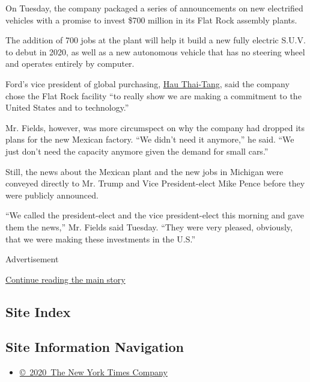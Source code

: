 On Tuesday, the company packaged a series of announcements on new
electrified vehicles with a promise to invest \$700 million in its Flat
Rock assembly plants.

The addition of 700 jobs at the plant will help it build a new fully
electric S.U.V. to debut in 2020, as well as a new autonomous vehicle
that has no steering wheel and operates entirely by computer.

Ford's vice president of global purchasing,
\href{https://media.ford.com/content/fordmedia/fna/us/en/people/hau-thai-tang.html}{Hau
Thai-Tang}, said the company chose the Flat Rock facility ``to really
show we are making a commitment to the United States and to
technology.''

Mr. Fields, however, was more circumspect on why the company had dropped
its plans for the new Mexican factory. ``We didn't need it anymore,'' he
said. ``We just don't need the capacity anymore given the demand for
small cars.''

Still, the news about the Mexican plant and the new jobs in Michigan
were conveyed directly to Mr. Trump and Vice President-elect Mike Pence
before they were publicly announced.

``We called the president-elect and the vice president-elect this
morning and gave them the news,'' Mr. Fields said Tuesday. ``They were
very pleased, obviously, that we were making these investments in the
U.S.''

Advertisement

\protect\hyperlink{after-bottom}{Continue reading the main story}

\hypertarget{site-index}{%
\subsection{Site Index}\label{site-index}}

\hypertarget{site-information-navigation}{%
\subsection{Site Information
Navigation}\label{site-information-navigation}}

\begin{itemize}
\tightlist
\item
  \href{https://help.nytimes.com/hc/en-us/articles/115014792127-Copyright-notice}{©~2020~The
  New York Times Company}
\end{itemize}

